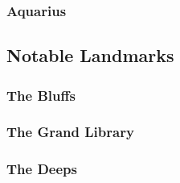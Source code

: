 		\subsubsection{Aquarius}
	
	\subsection{Notable Landmarks}

		\subsubsection{The Bluffs}
		
		\subsubsection{The Grand Library}

		\subsubsection{The Deeps}

		\pagebreak

